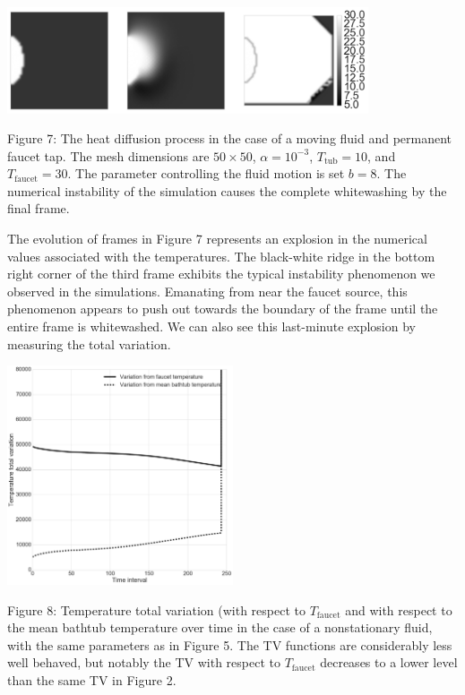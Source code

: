 \documentclass[12pt]{amsart}
\begin{document}
\begin{center}
    \includegraphics[width=0.8\textwidth]{../plots/diffusion-04.png}

    \justify
    \footnotesize{
    Figure 7: The heat diffusion process in the case of a moving fluid and
    permanent faucet tap. The mesh dimensions are $50 \times 50$, $\alpha =
    10^{-3}$, $T_{\mathrm{tub}} = 10$, and $T_{\mathrm{faucet}} = 30$. The
    parameter controlling the fluid motion is set $b = 8$. The numerical
    instability of the simulation causes the complete whitewashing by the final
frame.}
\end{center}

The evolution of frames in Figure 7 represents an explosion in the numerical
values associated with the temperatures. The black-white ridge in the bottom
right corner of the third frame exhibits the typical instability phenomenon we
observed in the simulations. Emanating from near the faucet source, this
phenomenon appears to push out towards the boundary of the frame until the
entire frame is whitewashed. We can also see this last-minute explosion by
measuring the total variation.

\begin{center}
    \includegraphics[width=0.5\textwidth]{../plots/tv-04.png}

    \justify
    \footnotesize{
    Figure 8: Temperature total variation (with respect to $T_{\mathrm{faucet}}$
    and with respect to the mean bathtub temperature over time in the case of a
    nonstationary fluid, with the same parameters as in Figure 5. The TV
    functions are considerably less well behaved, but notably the TV with
    respect to $T_{\mathrm{faucet}}$ decreases to a lower level than the same TV
in Figure 2.}
\end{center}
\end{document}
